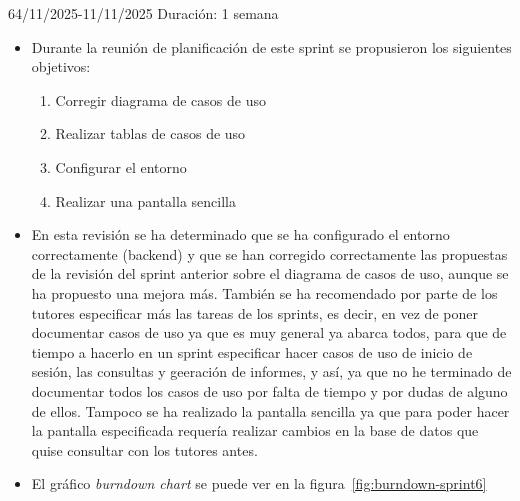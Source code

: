 \begin{Sprint}{6}{4/11/2025-11/11/2025}
	Duración: 1 semana
	\begin{itemize}	
		\item{}
		Durante la reunión de planificación de este sprint se propusieron los siguientes objetivos:
		\begin{enumerate}
			\item Corregir diagrama de casos de uso
			\item Realizar tablas de casos de uso
			\item Configurar el entorno
			\item Realizar una pantalla sencilla
		\end{enumerate}
		\item{}
		En esta revisión se ha determinado que se ha configurado el entorno correctamente (backend) y que se han corregido correctamente las propuestas de la revisión del sprint anterior sobre el diagrama de casos de uso, aunque se ha propuesto una mejora más. También se ha recomendado por parte de los tutores especificar más las tareas de los sprints, es decir, en vez de poner documentar casos de uso ya que es muy general ya abarca todos, para que de tiempo a hacerlo en un sprint especificar hacer casos de uso de inicio de sesión, las consultas y geeración de informes, y así, ya que no he terminado de documentar todos los casos de uso por falta de tiempo y por dudas de alguno de ellos. Tampoco se ha realizado la pantalla sencilla ya que para poder hacer la pantalla especificada requería realizar cambios en la base de datos que quise consultar con los tutores antes.
		\item{}
		El gráfico \textit{burndown chart} se puede ver en la figura~\ref{fig:burndown-sprint6} 

	\end{itemize}
\end{Sprint}

